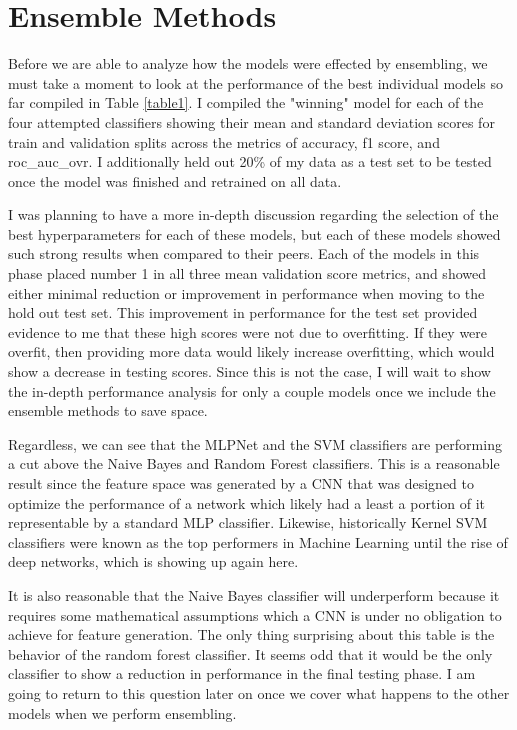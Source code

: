 \documentclass[12pt]{article}
\begin{document}
\section{Ensemble Methods}
Before we are able to analyze how the models were effected by ensembling, we must take a moment to look at the performance of the best 
individual models so far compiled in Table \ref{table1}. I compiled the "winning" model for each of the four attempted classifiers showing 
their mean and standard deviation scores for train and validation splits across the metrics of accuracy, f1 score, and roc\_auc\_ovr. I 
additionally held out 20\% of my data as a test set to be tested once the model was finished and retrained on all data. 

I was planning to have a more in-depth discussion regarding the selection of the best hyperparameters for each of these models, but each of these models
showed such strong results when compared to their peers. Each of the models in this phase placed number 1 in all three mean validation score metrics, 
and showed either minimal reduction or improvement in performance when moving to the hold out test set. This improvement in performance for the test
set provided evidence to me that these high scores were not due to overfitting. If they were overfit, then providing more data would likely increase 
overfitting, which would show a decrease in testing scores. Since this is not the case, I will wait to show the in-depth performance analysis for only 
a couple models once we include the ensemble methods to save space.

Regardless, we can see that the MLPNet and the SVM classifiers are performing a cut above the Naive Bayes and Random Forest classifiers. This 
is a reasonable result since the feature space was generated by a CNN that was designed to optimize the performance of a network which likely 
had a least a portion of it representable by a standard MLP classifier. Likewise, historically Kernel SVM classifiers were known as the top 
performers in Machine Learning until the rise of deep networks, which is showing up again here. 

It is also reasonable that the Naive Bayes classifier will underperform because it requires some mathematical assumptions which a CNN is 
under no obligation to achieve for feature generation. The only thing surprising about this table is the behavior of the random forest 
classifier. It seems odd that it would be the only classifier to show a reduction in performance in the final testing phase. I am going to return 
to this question later on once we cover what happens to the other models when we perform ensembling.
\end{document}

